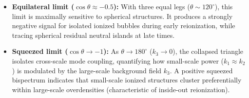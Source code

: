 \documentclass[apj,twocolumn, appendixfloats, twocolappendix, numberedappendix, tighten]{openjournal}
\begin{document}
\begin{itemize}
    \item \textbf{Equilateral limit ($\cos\theta \approx -0.5$):} With three equal legs ($\theta \sim 120^\circ$), this limit is maximally sensitive to spherical structures. It produces a strongly negative signal for isolated ionized bubbles during early reionization, while tracing spherical residual neutral islands at late times. %


    \item \textbf{Squeezed limit ($\cos\theta \to -1$):} As $\theta \to 180^\circ$ ($k_3 \to 0$), the collapsed triangle isolates cross-scale mode coupling, quantifying how small-scale power ($k_1 \approx k_2$) is modulated by the large-scale background field $k_3$. A positive squeezed bispectrum indicates that small-scale ionized structures cluster preferentially within large-scale overdensities (characteristic of inside-out reionization). %
\end{itemize}
\end{document}
